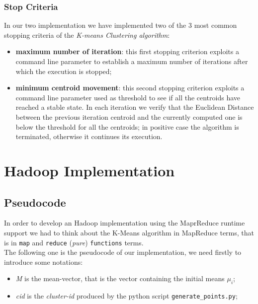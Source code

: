 \documentclass[11pt,a4paper]{article}
\begin{document}
\subsubsection{Stop Criteria}\label{sez:sc}
In our two implementation we have implemented two of the 3 most common stopping criteria of the \textit{K-means Clustering algorithm}:
\begin{itemize}
	\item \textbf{maximum number of iteration}: this first stopping criterion exploits a command line parameter to establish a maximum number of iterations after which the execution is stopped;
	\item \textbf{minimum centroid movement}: this second stopping criterion exploits a command line parameter used as threshold to see if all the centroids have reached a stable state. In each iteration we verify that the Euclidean Distance between the previous iteration centroid and the currently computed one is below the threshold for all the centroids; in positive case the algorithm is terminated, otherwise it continues its execution.
\end{itemize}


\section{Hadoop Implementation}\label{sez:hadoop}
\subsection{Pseudocode}
In order to develop an Hadoop implementation using the MaprReduce runtime support we had to think about the K-Means algorithm in MapReduce terms, that is in \texttt{map} and \texttt{reduce} (\textit{pure}) \texttt{functions} terms.\\ 
The following one is the pseudocode of our implementation, we need firstly to introduce some notations:
\begin{itemize}
	\item \textit{M} is the mean-vector, that is the vector containing the initial means $\mu_i$;
	\item \textit{cid} is the \textit{cluster-id} produced by the python script \texttt{generate\_points.py};
\end{itemize}
\end{document}
